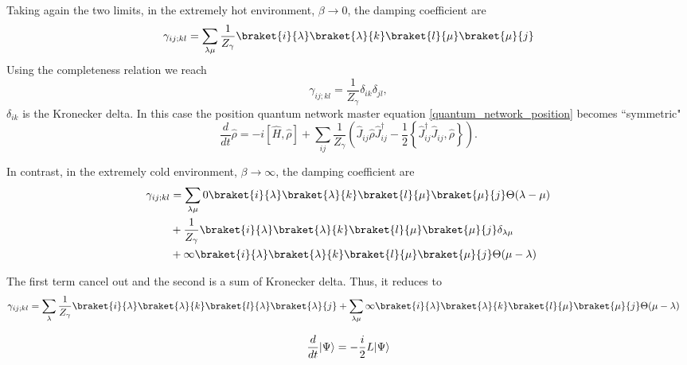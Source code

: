 Taking again the two limits, in the extremely hot environment, $\beta \rightarrow 0$, the damping coefficient are
\begin{equation}
    \gamma_{ij;kl}= \sum_{\lambda\mu} \frac{1}{Z_\gamma} \braket{i}{\lambda}\braket{\lambda}{k}\braket{l}{\mu}\braket{\mu}{j}
\end{equation}
Using the completeness relation we reach
\begin{equation}
    \gamma_{ij;kl} = \frac{1}{Z_\gamma} \delta_{ik}\delta_{jl},
\end{equation}
$\delta_{ik}$ is the Kronecker delta.
In this case the position quantum network master equation \eqref{quantum_network_position} becomes “symmetric"
\begin{equation}
    \frac{d}{dt}\hat\rho = -i\left[\hat H,\hat\rho\right] +\sum_{ij} \frac{1}{Z_\gamma} \left(\hat J_{ij}\hat\rho \hat J_{ij}^\dagger - \frac{1}{2}\left\{ \hat J_{ij}^\dagger\hat J_{ij}, \hat\rho\right\} \right).
\end{equation}

In contrast, in the extremely cold environment, $\beta \rightarrow \infty$, the damping coefficient are
\begin{equation}
    \begin{split}
        \gamma_{ij;kl}&= \sum_{\lambda\mu}0\braket{i}{\lambda}\braket{\lambda}{k}\braket{l}{\mu}\braket{\mu}{j}\Theta(\lambda-\mu)\\
        &+\frac{1}{Z_\gamma}\braket{i}{\lambda}\braket{\lambda}{k}\braket{l}{\mu}\braket{\mu}{j}\delta_{\lambda\mu}\\
        &+ \infty\braket{i}{\lambda}\braket{\lambda}{k}\braket{l}{\mu}\braket{\mu}{j}\Theta(\mu-\lambda)
    \end{split}
\end{equation}

The first term cancel out and the second is a sum of Kronecker delta. Thus, it reduces to
\begin{equation}
    \begin{split}
        \gamma_{ij;kl}&= \sum_{\lambda}\frac{1}{Z_\gamma}\braket{i}{\lambda}\braket{\lambda}{k}\braket{l}{\lambda}\braket{\lambda}{j}+ \sum_{\lambda\mu}\infty\braket{i}{\lambda}\braket{\lambda}{k}\braket{l}{\mu}\braket{\mu}{j}\Theta(\mu-\lambda)
    \end{split}
\end{equation}


\begin{equation}
    \frac{d}{dt}\lvert\Psi\rangle=-\frac{i}{2} L\lvert\Psi\rangle
\end{equation}

